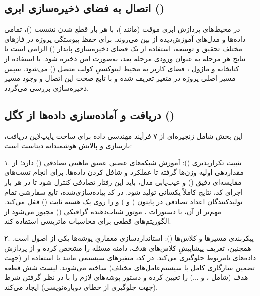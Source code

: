\documentclass{article}
\begin{document}
\subsection{اتصال به فضای ذخیره‌سازی ابری ()}

در محیط‌های پردازش ابری موقت (مانند )، با هر بار قطع شدن نشست ()، تمامی داده‌ها و مدل‌های آموزش‌دیده از بین می‌روند. برای حفظ پیوستگی پروژه در فازهای مختلف تحقیق و توسعه، استفاده از یک فضای ذخیره‌سازی پایدار () الزامی است تا نتایج هر مرحله به عنوان ورودی مرحله بعد، به‌صورت امن ذخیره شود.
با استفاده از کتابخانه  و ماژول ، فضای  کاربر به محیط لینوکسیِ کولب متصل () می‌شود. سپس مسیر اصلی پروژه در متغیر  تعریف شده و با تابع  صحت این اتصال و وجود مسیر ذخیره‌سازی بررسی می‌گردد.

\subsection{دریافت و آماده‌سازی داده‌ها از کگل ()}

این بخش شامل زنجیره‌ای از ۷ فرآیند مهندسی داده برای ساخت پایپ‌لاین دریافت، بازسازی و پالایش هوشمندانه دیتاست است:

\vspace{0.3cm}
۱. تثبیت تکرارپذیری ():
آموزش شبکه‌های عصبی عمیق ماهیتی تصادفی () دارد؛ از مقداردهی اولیه وزن‌ها گرفته تا عملکرد  و شافل کردن داده‌ها. برای انجام تست‌های مقایسه‌ای دقیق () و عیب‌یابی مدل، باید این رفتار تصادفی کنترل شود تا در هر بار اجرای کد، نتایج کاملاً یکسانی تولید شود. در کد پیاده‌سازی‌شده، تابع سفارشی  تمام تولیدکنندگان اعداد تصادفی در پایتون ( و ) و  را روی یک هسته ثابت () قفل می‌کند. مهم‌تر از آن، با دستورات ، موتور شتاب‌دهنده گرافیکی () مجبور می‌شود از الگوریتم‌های قطعی برای محاسبات ماتریسی استفاده کند.

\vspace{0.3cm}
۲. پیکربندی مسیرها و کلاس‌ها ():
استانداردسازی معماریِ پوشه‌ها یکی از اصول  است. همچنین، تعریف پیشاپیشِ کلاس‌های هدف، دامنه مسئله را مشخص کرده و از پردازش داده‌های نامربوط جلوگیری می‌کند. در کد، متغیرهای سیستمی مانند  با استفاده از  (جهت تضمین سازگاری کامل با سیستم‌عامل‌های مختلف) ساخته می‌شوند. لیست  شش قطعه هدف (شامل ،  و ...) را تعیین کرده و دستور  پوشه‌های لازم را با در نظر گرفتن شرط  (جهت جلوگیری از خطای دوباره‌نویسی) ایجاد می‌کند.
\end{document}
